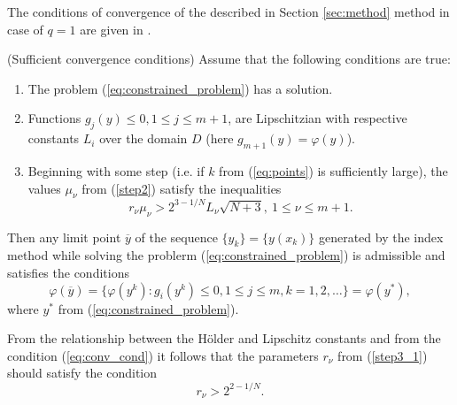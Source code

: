 \documentclass[runningheads]{llncs}
\begin{document}
The conditions of convergence of the described in Section \ref{sec:method} method in case of \(q=1\) are given in \cite{Strongin2000}.
\begin{theorem} (Sufficient convergence conditions)
  \label{th:single_conv}
  Assume that the following conditions are true:
  \begin{enumerate}
    \item The problem (\ref{eq:constrained_problem}) has a solution.
    \item Functions \(g_j(y)\leqslant 0, 1\leqslant j\leqslant m + 1\), are Lipschitzian with
respective constants \(L_i\) over the domain \(D\) (here \(g_{m+1}(y)=\varphi(y)\)).
    \item Beginning with some step (i.e. if \(k\) from (\ref{eq:points}) is sufficiently large),
    the values \(\mu_\nu\) from (\ref{step2}) satisfy the inequalities
    \begin{equation}
      r_\nu\mu_\nu > 2^{3-1/N}L_\nu \sqrt{N+3},\: 1\leqslant \nu \leqslant m + 1.
    \end{equation}
  \end{enumerate}
  Then any limit point \(\overline{y}\) of the sequence \(\{y_k\} = \{y(x_k)\}\) generated
  by the index method while solving the problerm
  (\ref{eq:constrained_problem}) is admissible and satisfies the conditions
\begin{equation}
  \label{eq:conv_cond}
  \varphi(\overline{y})=\{ \varphi(y^k): g_i(y^k)\leqslant 0,1\leqslant j\leqslant m, k=1,2,\dots\}=\varphi(y^*),
\end{equation}
  where \(y^*\) from (\ref{eq:constrained_problem}).
\end{theorem}

\begin{remark}
  \label{rem:r1}
  From the relationship between the H\"{o}lder and Lipschitz constants and from the condition (\ref{eq:conv_cond}) it follows
  that the parameters \(r_\nu\) from (\ref{step3_1}) should satisfy the condition
  \begin{equation}
    r_\nu > 2^{2 - 1/N}.
  \end{equation}
\end{remark}
\end{document}
